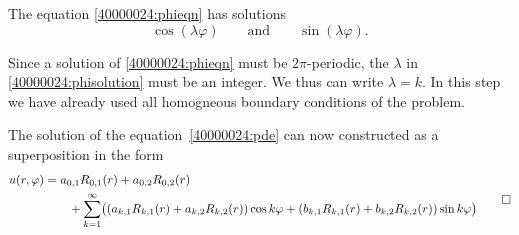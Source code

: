 \begin{loesung}
\begin{teilaufgaben}
\item
The equation \eqref{40000024:phieqn} has solutions
\begin{equation}
\cos(\lambda\varphi)
\qquad\text{and}\qquad
\sin(\lambda\varphi).
\label{40000024:phisolution}
\end{equation}

\item
Since a solution of \eqref{40000024:phieqn} must be $2\pi$-periodic,
the $\lambda$ in \eqref{40000024:phisolution} must be an integer.
We thus can write $\lambda=k$.
In this step we have already used all homogneous boundary conditions of
the problem.
\item
The solution of the equation~\eqref{40000024:pde} can now constructed
as a superposition in the form
\begin{equation}
\begin{aligned}
u(r,\varphi)
&=
a_{0,1} R_{0,1}(r) + a_{0,2} R_{0,2}(r)
\\
&\qquad
+
\sum_{k=1}^\infty
\bigl(
(a_{k,1}R_{k,1}(r) + a_{k,2}R_{k,2}(r))
\cos k\varphi
+
(b_{k,1}R_{k,1}(r) + b_{k,2}R_{k,2}(r))
\sin k\varphi
\bigr)
\end{aligned}
\label{40000024:series}
\qedhere
\end{equation}
\end{teilaufgaben}
\end{loesung}

